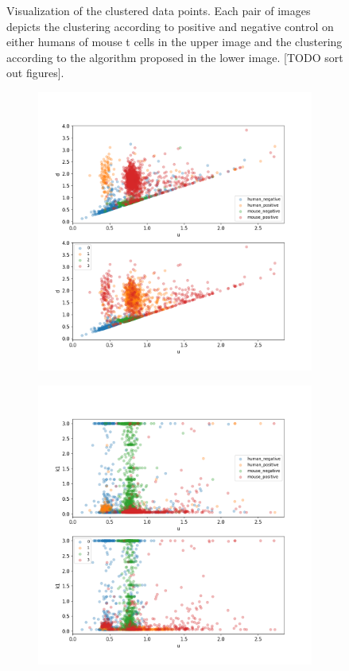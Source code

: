 \begin{figure}
	\caption{Visualization of the clustered data points. Each pair of images depicts the clustering according to positive and negative control on either humans of mouse t cells in the upper image and the clustering according to the algorithm proposed in the lower image. [TODO sort out figures].}
\label{fig:vis_output_seperate1}
\end{figure}
	
\begin{figure}
	\begin{subfigure}{0.45\textwidth}
		\includegraphics[width=\textwidth]{fig/seperate_u_d}
	\end{subfigure}
	\hfill
	\begin{subfigure}{0.45\textwidth}
		\includegraphics[width=\textwidth]{fig/seperate_u_k1}

\end{subfigure}
\end{figure}
